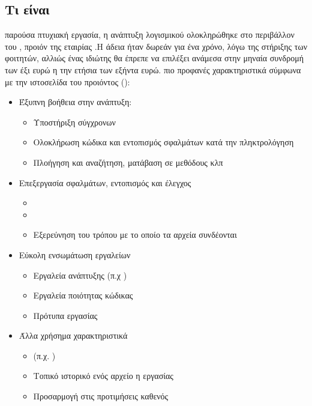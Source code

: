 \subsection*{Τι είναι}
 παρούσα πτυχιακή εργασία, η ανάπτυξη λογισμικού ολοκληρώθηκε στο περιβάλλον του , προιόν της εταιρίας .Η άδεια ήταν δωρεάν για ένα χρόνο, λόγω της στήριξης των φοιτητών, αλλιώς ένας ιδιώτης θα έπρεπε να επιλέξει ανάμεσα στην μηναία συνδρομή των έξι ευρώ η την ετήσια των εξήντα ευρώ.\newline
{} πιο προφανές χαρακτηριστικά σύμφωνα με την ιστοσελίδα του προιόντος ():
\begin{itemize}
    \item Έξυπνη βοήθεια στην ανάπτυξη:
        \begin{itemize}
            \item Υποστήριξη σύγχρονων 
            \item Ολοκλήρωση κώδικα και εντοπισμός σφαλμάτων κατά την πληκτρολόγηση
            \item Πλοήγηση και αναζήτηση, ματάβαση σε μεθόδους κλπ
        \end{itemize}
    \item Επεξεργασία σφαλμάτων, εντοπισμός και έλεγχος
        \begin{itemize}
            \item {}
            \item {}
            \item Εξερεύνηση του τρόπου με το οποίο τα αρχεία συνδέονται
        \end{itemize}
    \item Εύκολη ενσωμάτωση εργαλείων
        \begin{itemize}
            \item Εργαλεία ανάπτυξης (π.χ )
            \item Εργαλεία ποιότητας κώδικας
            \item Πρότυπα εργασίας
        \end{itemize}
    \item Άλλα χρήσημα χαρακτηριστικά
        \begin{itemize}
            \item {} (π.χ. )
            \item Τοπικό ιστορικό ενός αρχείο η εργασίας
            \item Προσαρμογή στις προτιμήσεις καθενός
        \end{itemize}
\end{itemize}

